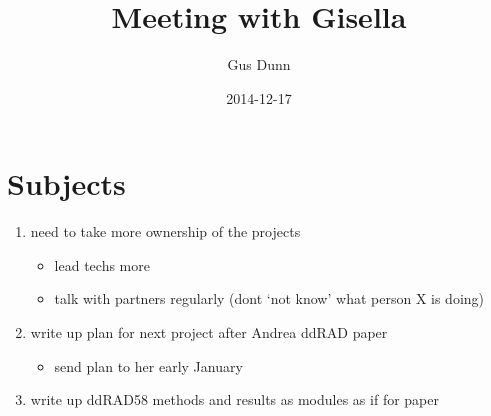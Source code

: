 \documentclass[letterpaper]{scrartcl}
\title{Meeting with Gisella}
\author{Gus Dunn}
\date{2014-12-17}
\begin{document}
\maketitle

{
\hypersetup{linkcolor=black}
\setcounter{tocdepth}{3}
\tableofcontents
}
\section{Subjects}\label{subjects}

\begin{enumerate}
\def\labelenumi{\arabic{enumi}.}
\itemsep1pt\parskip0pt
\item
  need to take more ownership of the projects

  \begin{itemize}
  \itemsep1pt\parskip0pt
  \item
    lead techs more
  \item
    talk with partners regularly (dont `not know' what person X is
    doing)
  \end{itemize}
\item
  write up plan for next project after Andrea ddRAD paper

  \begin{itemize}
  \itemsep1pt\parskip0pt
  \item
    send plan to her early January
  \end{itemize}
\item
  write up ddRAD58 methods and results as modules as if for paper
\end{enumerate}
\end{document}
